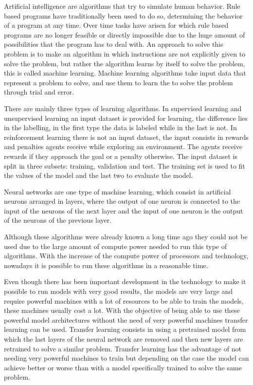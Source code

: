 \documentclass[12pt,a4paper]{article}
\begin{document}
Artificial intelligence are algorithms that try to simulate human behavior. Rule based programs have traditionally been used to do so, determining the behavior of a program at any time. Over time tasks have arisen for which rule based programs are no longer feasible or directly impossible due to the huge amount of possibilities that the program has to deal with. An approach to solve this problem is to make an algorithm in which instructions are not explicitly given to solve the problem, but rather the algorithm learns by itself to solve the problem, this is called machine learning. Machine learning algorithms take input data that represent a problem to solve, and use them to learn the to solve the problem through trial and error.
\bigskip

There are mainly three types of learning algorithms. In supervised learning and unsupervised learning an input dataset is provided for learning, the difference lies in the labelling, in the first type the data is labeled while in the last is not. In reinforcement learning there is not an input dataset, the input consists in rewards and penalties agents receive while exploring an environment. The agents receive rewards if they approach the goal or a penalty otherwise. The input dataset is split in three subsets: training, validation and test. The training set is used to fit the values of the model and the last two to evaluate the model.
\bigskip

Neural networks are one type of machine learning, which consist in artificial neurons arranged in layers, where the output of one neuron is connected to the input of the neurons of the next layer and the input of one neuron is the output of the neurons of the previous layer.
\bigskip

Although these algorithms were already known a long time ago they could not be used due to the large amount of compute power needed to run this type of algorithms. With the increase of the compute power of processors and technology, nowadays it is possible to run these algorithms in a reasonable time.
\bigskip

Even though there has been important development in the technology to make it possible to run models with very good results, the models are very large and require powerful machines with a lot of resources to be able to train the models, these machines usually cost a lot. With the objective of being able to use these powerful model architectures without the need of very powerful machines transfer learning can be used. Transfer learning consists in using a pretrained model from which the last layers of the neural network are removed and then new layers are retrained to solve a similar problem. Transfer learning has the advantage of not needing very powerful machines to train but depending on the case the model can achieve better or worse than with a model specifically trained to solve the same problem.
\bigskip
\end{document}
